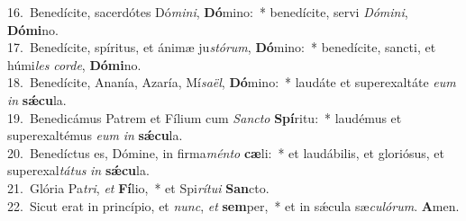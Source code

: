 {16.~}Benedícite, sacerdótes Dó\textit{mi}\textit{ni}, \textbf{Dó}mino:~* benedícite, servi \textit{Dó}\textit{mi}\textit{ni}, \textbf{Dó}\textbf{mi}no.\\
{17.~}Benedícite, spíritus, et ánimæ ju\textit{stó}\textit{rum}, \textbf{Dó}mino:~* benedícite, sancti, et húmi\textit{les} \textit{cor}\textit{de}, \textbf{Dó}\textbf{mi}no.\\
{18.~}Benedícite, Ananía, Azaría, Mí\textit{sa}\textit{ël}, \textbf{Dó}mino:~* laudáte et superexaltáte \textit{e}\textit{um} \textit{in} \textbf{sǽ}\textbf{cu}la.\\
{19.~}Benedicámus Patrem et Fílium cum \textit{San}\textit{cto} \textbf{Spí}ritu:~* laudémus et superexaltémus \textit{e}\textit{um} \textit{in} \textbf{sǽ}\textbf{cu}la.\\
{20.~}Benedíctus es, Dómine, in firma\textit{mén}\textit{to} \textbf{cæ}li:~* et laudábilis, et gloriósus, et superexal\textit{tá}\textit{tus} \textit{in} \textbf{sǽ}\textbf{cu}la.\\
{21.~}Glória Pa\textit{tri}, \textit{et} \textbf{Fí}lio,~* et Spi\textit{rí}\textit{tu}\textit{i} \textbf{San}cto.\\
{22.~}Sicut erat in princípio, et \textit{nunc}, \textit{et} \textbf{sem}per,~* et in sǽcula sæ\textit{cu}\textit{ló}\textit{rum}. \textbf{A}men.\\
